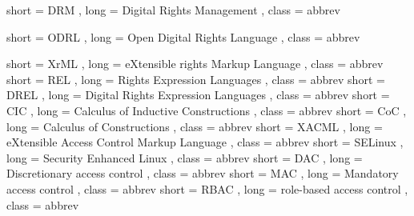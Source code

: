 {
  short = DRM ,
  long  = Digital Rights Management ,
  class = abbrev
}

{
  short = ODRL ,
  long  = Open Digital Rights Language ,
  class = abbrev
}

{
  short = XrML ,
  long  = eXtensible rights Markup Language ,
  class = abbrev
}
{
  short = REL ,
  long  = Rights Expression Languages ,
  class = abbrev
}
{
  short = DREL ,
  long  = Digital Rights Expression Languages ,
  class = abbrev
}
{
  short = CIC ,
  long  = Calculus of Inductive Constructions ,
  class = abbrev
}
{
  short = CoC ,
  long  = Calculus of Constructions ,
  class = abbrev
}
{
  short = XACML ,
  long  = eXtensible Access Control Markup Language ,
  class = abbrev
}
{
  short = SELinux ,
  long  = Security Enhanced Linux ,
  class = abbrev
}
{
  short = DAC ,
  long  = Discretionary access control ,
  class = abbrev
}
{
  short = MAC ,
  long  = Mandatory access control ,
  class = abbrev
}
{
  short = RBAC ,
  long  = role-based access control ,
  class = abbrev
}


